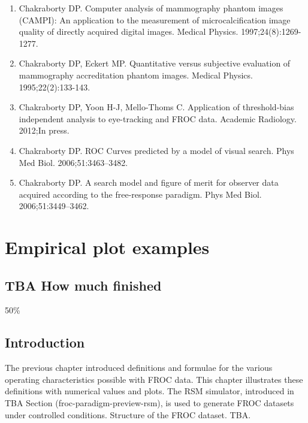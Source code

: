\documentclass[
]{book}
\providecommand{\tightlist}{%
  \setlength{\itemsep}{0pt}\setlength{\parskip}{0pt}}
\begin{document}
\begin{enumerate}
\def\labelenumi{\arabic{enumi}.}
\tightlist
\item
  Chakraborty DP. Computer analysis of mammography phantom images (CAMPI): An application to the measurement of microcalcification image quality of directly acquired digital images. Medical Physics. 1997;24(8):1269-1277.
\item
  Chakraborty DP, Eckert MP. Quantitative versus subjective evaluation of mammography accreditation phantom images. Medical Physics. 1995;22(2):133-143.
\item
  Chakraborty DP, Yoon H-J, Mello-Thoms C. Application of threshold-bias independent analysis to eye-tracking and FROC data. Academic Radiology. 2012;In press.
\item
  Chakraborty DP. ROC Curves predicted by a model of visual search. Phys Med Biol. 2006;51:3463--3482.
\item
  Chakraborty DP. A search model and figure of merit for observer data acquired according to the free-response paradigm. Phys Med Biol. 2006;51:3449--3462.
\end{enumerate}

\hypertarget{froc-empirical-examples}{%
\chapter{Empirical plot examples}\label{froc-empirical-examples}}

\hypertarget{froc-empirical-examples-how-much-finished}{%
\section{TBA How much finished}\label{froc-empirical-examples-how-much-finished}}

50\%

\hypertarget{froc-empirical-examples-intro}{%
\section{Introduction}\label{froc-empirical-examples-intro}}

The previous chapter introduced definitions and formulae for the various operating characteristics possible with FROC data. This chapter illustrates these definitions with numerical values and plots. The RSM simulator, introduced in TBA Section (froc-paradigm-preview-rsm), is used to generate FROC datasets under controlled conditions. Structure of the FROC dataset. TBA.
\end{document}

